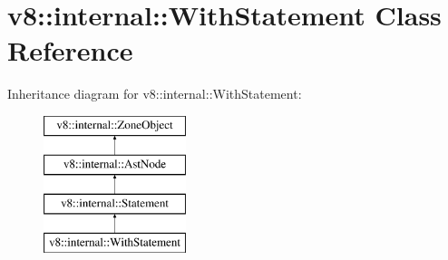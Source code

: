 \hypertarget{classv8_1_1internal_1_1_with_statement}{}\section{v8\+:\+:internal\+:\+:With\+Statement Class Reference}
\label{classv8_1_1internal_1_1_with_statement}
Inheritance diagram for v8\+:\+:internal\+:\+:With\+Statement\+:\begin{figure}[H]
\begin{center}
\leavevmode
\includegraphics[height=4.000000cm]{classv8_1_1internal_1_1_with_statement}
\end{center}
\end{figure}
